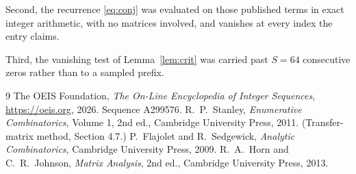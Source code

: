 \documentclass[11pt,a4paper]{article}
\theoremstyle{plain}
\theoremstyle{definition}
\begin{document}
Second, the recurrence \eqref{eq:conj} was evaluated on those published terms in exact
integer arithmetic, with no matrices involved, and vanishes at every index the entry claims.

Third, the vanishing test of Lemma~\ref{lem:crit} was carried past $S=64$ consecutive
zeros rather than to a sampled prefix.

\begin{thebibliography}{9}
 The OEIS Foundation, \emph{The On-Line Encyclopedia of Integer
Sequences}, \url{https://oeis.org}, 2026. Sequence A299576.
 R.~P.~Stanley, \emph{Enumerative Combinatorics}, Volume 1, 2nd ed.,
Cambridge University Press, 2011. (Transfer-matrix method, Section 4.7.)
 P.~Flajolet and R.~Sedgewick, \emph{Analytic Combinatorics}, Cambridge
University Press, 2009.
 R.~A.~Horn and C.~R.~Johnson, \emph{Matrix Analysis}, 2nd ed., Cambridge
University Press, 2013.
\end{thebibliography}
\end{document}
